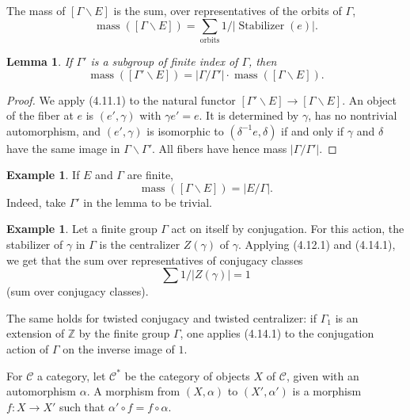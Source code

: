 \documentclass[11pt,a4paper]{article}
\theoremstyle{plain}
\newtheorem{lemma}[theorem]{Lemma}
\theoremstyle{definition}
\newtheorem{example}[theorem]{Example}
\DeclareMathOperator{\Stab}{Stabilizer}
\DeclareMathOperator{\mass}{mass}
\newcommand{\Z}{\mathbb{Z}}
\begin{document}
The mass of $[\Gamma \backslash E]$ is the sum, over representatives of the orbits of $\Gamma$,
\begin{equation}
\mass([\Gamma \backslash E]) = \sum_{\text{orbits}} 1/|\Stab(e)|. \tag{4.12.1}
\end{equation}

\begin{lemma}
If $\Gamma'$ is a subgroup of finite index of $\Gamma$, then
\begin{equation}
\mass([\Gamma' \backslash E]) = |\Gamma/\Gamma'| \cdot \mass([\Gamma \backslash E]). \tag{4.13.1}
\end{equation}
\end{lemma}

\begin{proof}
We apply (4.11.1) to the natural functor $[\Gamma' \backslash E] \to [\Gamma \backslash E]$. An object of the fiber at $e$ is $(e', \gamma)$ with $\gamma e' = e$. It is determined by $\gamma$, has no nontrivial automorphism, and $(e', \gamma)$ is isomorphic to $(\delta^{-1} e, \delta)$ if and only if $\gamma$ and $\delta$ have the same image in $\Gamma \backslash \Gamma'$. All fibers have hence mass $|\Gamma/\Gamma'|$.
\end{proof}

\begin{example}
If $E$ and $\Gamma$ are finite,
\begin{equation}
\mass([\Gamma \backslash E]) = |E/\Gamma|. \tag{4.14.1}
\end{equation}
Indeed, take $\Gamma'$ in the lemma to be trivial.
\end{example}

\begin{example}
Let a finite group $\Gamma$ act on itself by conjugation. For this action, the stabilizer of $\gamma$ in $\Gamma$ is the centralizer $Z(\gamma)$ of $\gamma$. Applying (4.12.1) and (4.14.1), we get that the sum over representatives of conjugacy classes
\begin{equation}
\sum 1/|Z(\gamma)| = 1 \tag{4.15.1}
\end{equation}
(sum over conjugacy classes).
\end{example}

The same holds for twisted conjugacy and twisted centralizer: if $\Gamma_1$ is an extension of $\Z$ by the finite group $\Gamma$, one applies (4.14.1) to the conjugation action of $\Gamma$ on the inverse image of $1$.

For $\mathcal{C}$ a category, let $\mathcal{C}^*$ be the category of objects $X$ of $\mathcal{C}$, given with an automorphism $\alpha$. A morphism from $(X, \alpha)$ to $(X', \alpha')$ is a morphism $f: X \to X'$ such that $\alpha' \circ f = f \circ \alpha$.
\end{document}
